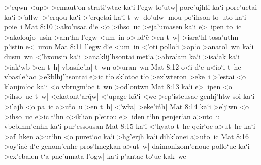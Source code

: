 >'eqwn
<up>
>emaut`on
strati'wtac
ka`i
l'egw
to'utw|
pore'ujhti
ka`i
pore'uetai
ka`i
>'allw|
>'erqou
ka`i
>'erqetai
ka`i
t~w|
do'ulw|
mou
po'ihson
to~uto
ka`i
poie~i\bibvsend
\vs Mat 8:10
>ako'usac
d`e
<o
>ihso~uc
>eja'umasen
ka`i
e>~ipen
to~ic
>akoloujo~usin
>am`hn
l'egw
<um~in
o>ud`e\r{}
>en
t~w|
>isra`hl
tosa'uthn
p'istin
e<~uron\bibvsend
\vs Mat 8:11
l'egw
d`e
<um~in
<'oti
pollo`i
>ap`o
>anatol~wn
ka`i
dusm~wn
<'hxousin
ka`i
>anaklij'hsontai
met`a
>abra`am
ka`i
>isa`ak
ka`i
>iak`wb
>en
t~h|
vbasile'ia|
t~wn
o>uran~wn\bibvsend
\vs Mat 8:12
o<i
d`e
u<io`i
t~hc
vbasile'iac
>e\r{k}blhj'hsontai
e>ic
t`o
sk'otoc
t`o
>ex'wteron
>eke~i
>'estai
<o
klaujm`oc
ka`i
<o
vbrugm`oc
t~wn
>od'ontwn\bibvsend
\vs Mat 8:13
ka`i
e>~ipen
<o
>ihso~uc
t~w|
<ekatont'ar\r{q}w|
<'upage
k\r{a}`i
<wc
>ep'isteusac
genhj'htw
soi
ka`i
>i'ajh
<o
pa~ic
a>u\r{t}o~u
>en
t~h|
<'w\r{r}a|
>eke'i\r{n}h|\bibvsend
{}
\vs Mat 8:14
ka`i
>elj`wn
<o
>ihso~uc
e>ic
t`hn
o>ik'ian
p'etrou
e>~iden
t`hn
penjer`an
a>uto~u
vbeblhm'enhn
ka`i
pur'essousan\bibvsend
\vs Mat 8:15
ka`i
<'hyato
t~hc
qeir`oc
a>ut~hc
ka`i
>af~hken
a>ut`hn
<o
puret`oc
ka`i
>hg'erjh
ka`i
dihk'onei
a>u\r{t}o~ic\bibvsend
{}
\vs Mat 8:16
>oy'iac\r{}
d`e
genom'enhc
pros'hnegkan
a>ut~w|
daimonizom'enouc
pollo`uc
ka`i
>ex'ebalen
t`a
pne'umata
l'ogw|
ka`i
p'antac
to`uc
kak~wc
